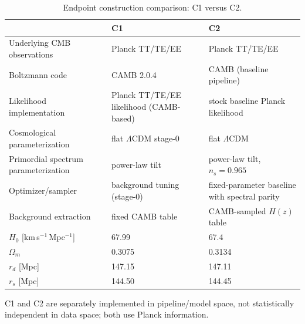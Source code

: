 \begin{table}[!htbp]
  \centering
  \caption{Endpoint construction comparison: C1 versus C2.}
  \label{tab:endpoint-construction}
  {\small
  \begin{tabularx}{\linewidth}{lXX}
    \toprule
     & C1 & C2 \\
    \midrule
    Underlying CMB observations & Planck TT/TE/EE & Planck TT/TE/EE \\
    Boltzmann code & CAMB 2.0.4 & CAMB (baseline pipeline) \\
    Likelihood implementation & Planck TT/TE/EE likelihood (CAMB-based) &
      stock baseline Planck likelihood \\
    Cosmological parameterization & flat $\Lambda$CDM stage-0 &
      flat $\Lambda$CDM \\
    Primordial spectrum parameterization & power-law tilt &
      power-law tilt, $n_{s}=0.965$ \\
    Optimizer/sampler & background tuning (stage-0) &
      fixed-parameter baseline with spectral parity \\
    Background extraction & fixed CAMB table &
      CAMB-sampled $H(z)$ table \\
    $H_{0}$ [km\,s$^{-1}$\,Mpc$^{-1}$] & 67.99 & 67.4 \\
    $\Omega_{m}$ & 0.3075 & 0.3134 \\
    $r_{d}$ [Mpc] & 147.15 & 147.11 \\
    $r_{s}$ [Mpc] & 144.50 & 144.45 \\
    \bottomrule
  \end{tabularx}
  }
\end{table}

C1 and C2 are separately implemented in pipeline/model space,
not statistically independent in data space; both use Planck
information.
